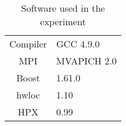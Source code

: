 \begin{table}
    \caption{Software used in the experiment}
    \centering
    \label{tab:software-used}
    \begin{tabular}{cl}  
        \toprule
        Compiler         & GCC 4.9.0                       \\
        MPI              & MVAPICH 2.0                     \\
        Boost            & 1.61.0                          \\
        hwloc            & 1.10                            \\
        HPX              & 0.99                            \\
        \bottomrule
    \end{tabular}
\end{table}

